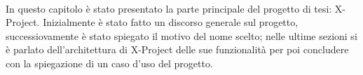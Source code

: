 \paragraph{}
In questo capitolo è stato presentato la parte principale del progetto di tesi: X-Project.
Inizialmente è stato fatto un discorso generale sul progetto, successiovamente è stato spiegato il motivo del nome scelto; nelle ultime sezioni si è parlato dell'architettura di X-Project delle sue funzionalità per poi concludere con la spiegazione di un caso d'uso del progetto.

